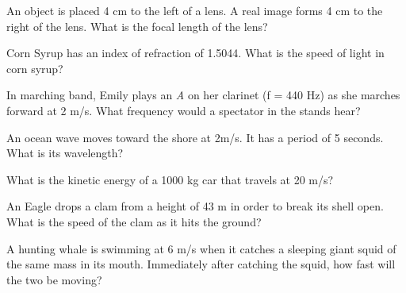 \documentclass[10pt]{examdesign}
\begin{document}
\begin{multiplechoice} [title={Multiple Choice (3 Points Each)},
	rearrange=yes]
\begin{question}
	An object is placed 4 cm to the left of a lens.  A real image forms 4 cm to the right of the lens.  What is the focal length of the lens?
		\choice{1 cm}
		\choice[!]{2 cm}
		\choice{3 cm}
		\choice{4 cm}
\end{question}

\begin{question}
 Corn Syrup has an index of refraction of 1.5044.  What is the speed of light in corn syrup?
\end{question}

\begin{question}
	In marching band, Emily plays an \textit{A} on her clarinet (f = 440 Hz) as she marches forward at 2 m/s.  What frequency would a spectator in the stands hear? 
\end{question}

\begin{question}
	An ocean wave moves toward the shore at 2m/s.  It has a period of 5 seconds.  What is its wavelength?
\end{question}



\begin{question}
	What is the kinetic energy of a 1000 kg car that travels at 20 m/s?
\end{question}

\begin{question}
	An Eagle drops a clam from a height of 43 m in order to break its shell open.  What is the speed of the clam as it hits the ground?
	
\end{question}

	\begin{question}
	A hunting whale is swimming at 6 m/s when it catches a sleeping giant squid of the same mass in its mouth.  Immediately after catching the squid, how fast will the two be moving?
\end{question}




\end{multiplechoice}
\end{document}
